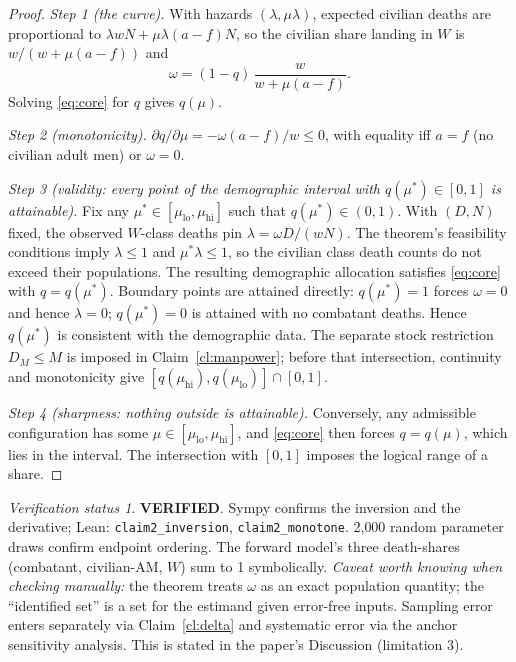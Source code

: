 \documentclass[11pt,a4paper]{article}
\theoremstyle{plain}
\theoremstyle{remark}
\newtheorem*{verification}{Verification status}
\newcommand{\PASS}{\textcolor{green!50!black}{\textbf{VERIFIED}}}
\begin{document}
\begin{proof}
\emph{Step 1 (the curve).} With hazards $(\lambda,\mu\lambda)$, expected civilian deaths are proportional to $\lambda wN + \mu\lambda(a-f)N$, so the civilian share landing in $W$ is $w/(w+\mu(a-f))$ and
\begin{equation}\label{eq:core}
\omega = (1-q)\,\frac{w}{w+\mu(a-f)}.
\end{equation}
Solving \eqref{eq:core} for $q$ gives $q(\mu)$.

\emph{Step 2 (monotonicity).} $\partial q/\partial\mu = -\omega(a-f)/w \le 0$, with equality iff $a=f$ (no civilian adult men) or $\omega=0$.

\emph{Step 3 (validity: every point of the demographic interval with $q(\mu^\ast)\in[0,1]$ is attainable).} Fix any $\mu^\ast\in[\mu_{\mathrm{lo}},\mu_{\mathrm{hi}}]$ such that $q(\mu^\ast)\in(0,1)$. With $(D,N)$ fixed, the observed $W$-class deaths pin $\lambda=\omega D/(wN)$. The theorem's feasibility conditions imply $\lambda\le1$ and $\mu^\ast\lambda\le1$, so the civilian class death counts do not exceed their populations. The resulting demographic allocation satisfies \eqref{eq:core} with $q=q(\mu^\ast)$. Boundary points are attained directly: $q(\mu^\ast)=1$ forces $\omega=0$ and hence $\lambda=0$; $q(\mu^\ast)=0$ is attained with no combatant deaths. Hence $q(\mu^\ast)$ is consistent with the demographic data. The separate stock restriction $D_M\le M$ is imposed in Claim~\ref{cl:manpower}; before that intersection, continuity and monotonicity give $[q(\mu_{\mathrm{hi}}),q(\mu_{\mathrm{lo}})]\cap[0,1]$.

\emph{Step 4 (sharpness: nothing outside is attainable).} Conversely, any admissible configuration has some $\mu\in[\mu_{\mathrm{lo}},\mu_{\mathrm{hi}}]$, and \eqref{eq:core} then forces $q=q(\mu)$, which lies in the interval. The intersection with $[0,1]$ imposes the logical range of a share.
\end{proof}

\begin{verification}
\PASS. Sympy confirms the inversion and the derivative; Lean: \texttt{claim2\_inversion}, \texttt{claim2\_monotone}. 2{,}000 random parameter draws confirm endpoint ordering. The forward model's three death-shares (combatant, civilian-$\mathrm{AM}$, $W$) sum to 1 symbolically. \emph{Caveat worth knowing when checking manually:} the theorem treats $\omega$ as an exact population quantity; the ``identified set'' is a set for the estimand given error-free inputs. Sampling error enters separately via Claim~\ref{cl:delta} and systematic error via the anchor sensitivity analysis. This is stated in the paper's Discussion (limitation 3).
\end{verification}
\end{document}
